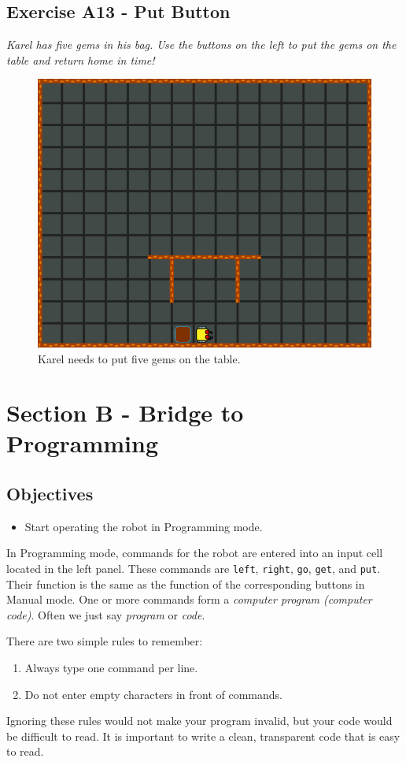 \documentclass[article,A4,12pt]{llncs}
\begin{document}
\subsection{Exercise A13 - Put Button}

{\em Karel has five gems in his bag. Use the buttons on the left to put the gems on the table and 
return home in time!}\\[-7mm]

\begin{figure}[!ht]
\begin{center}
\includegraphics[height=0.4\textwidth]{img/a13.png}
\end{center}
\vspace{-4mm}
\caption{Karel needs to put five gems on the table.}
\label{fig:a13}
\vspace{-4mm}
\end{figure}
\noindent
\newpage

\section{Section B - Bridge to Programming}

\subsection{Objectives} 
 
\begin{itemize}
\item Start operating the robot in Programming mode.
\end{itemize}
In Programming mode, commands for the robot are entered into an input cell located in the left panel.
These commands are {\tt left}, {\tt right}, {\tt go}, {\tt get}, and {\tt put}.
Their function is the same as the function of the corresponding buttons in Manual mode.
One or more commands form a {\em computer program (computer code)}. Often 
we just say {\em program} or {\em code}.

There are two simple rules to remember:
\begin{enumerate}
\item Always type one command per line.
\item Do not enter empty characters in front of commands. 
\end{enumerate}
Ignoring these rules would not make your program invalid, but your code would be 
difficult to read. It is important to write a clean, transparent code that is easy to read. 
\end{document}

